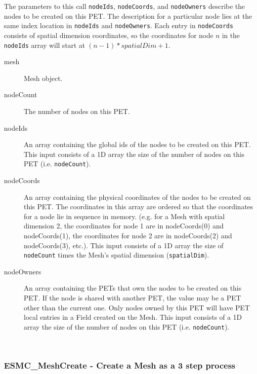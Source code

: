      The parameters to this call {\tt nodeIds}, {\tt nodeCoords}, and
     {\tt nodeOwners} describe the nodes to be created on this PET.
     The description for a particular node lies at the same index location in
     {\tt nodeIds} and {\tt nodeOwners}. Each entry
     in {\tt nodeCoords} consists of spatial dimension coordinates, so the coordinates
     for node $n$ in the {\tt nodeIds} array will start at $(n-1)*spatialDim+1$.
  
     \begin{description}
     \item[mesh]
       Mesh object.
     \item[nodeCount]
       The number of nodes on this PET.
     \item [nodeIds]
           An array containing the global ids of the nodes to be created on this PET.
          This input consists of a 1D array the size of the number of nodes on this PET (i.e. {\tt nodeCount}).
     \item[nodeCoords]
            An array containing the physical coordinates of the nodes to be created on this
            PET. The coordinates in this array are ordered
            so that the coordinates for a node lie in sequence in memory. (e.g. for a
            Mesh with spatial dimension 2, the coordinates for node 1 are in nodeCoords(0) and
            nodeCoords(1), the coordinates for node 2 are in nodeCoords(2) and nodeCoords(3),
            etc.). This input consists of a 1D array the size of {\tt nodeCount} times the Mesh's
            spatial dimension ({\tt spatialDim}).
     \item[nodeOwners]
           An array containing the PETs that own the nodes to be created on this PET.
           If the node is shared with another PET, the value
           may be a PET other than the current one. Only nodes owned by this PET
           will have PET local entries in a Field created on the Mesh. This
           input consists of a 1D array the size of the number of nodes on this PET (i.e. {\tt nodeCount}).
     \end{description}
   
 
\mbox{}\hrulefill\ 
 
\subsubsection [ESMC\_MeshCreate] {ESMC\_MeshCreate - Create a Mesh as a 3 step process \label{sec:mesh:capi:meshcreate}}


